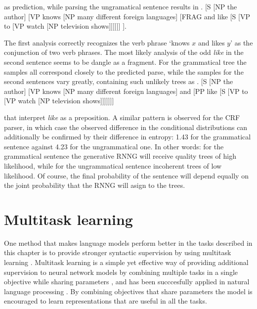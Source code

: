     as prediction, while parsing the ungramatical sentence results in
    \exi. [S [NP the author] [VP knows [NP many different foreign languages] [FRAG and like [S [VP to [VP watch [NP television shows]]]]]] ].

    The first analysis correctly recognizes the verb phrase `knows $x$ and likes $y$' as the conjunction of two verb phrases. The most likely analysis of the odd \textit{like} in the second sentence seems to be dangle as a fragment. For the grammatical tree the samples all correspond closely to the predicted parse, while  the samples for the second sentences vary greatly, containing such unlikely trees as
    \exi. [S [NP the author] [VP knows [NP many different foreign languages] and [PP like [S [VP to [VP watch [NP television shows]]]]]]]

    that interpret \textit{like} as a preposition. A similar pattern is observed for the CRF parser, in which case the observed difference in the conditional distributions can additionally be confirmed by their difference in entropy: 1.43 for the grammatical sentence against 4.23 for the ungrammatical one. In other words: for the grammatical sentence the generative RNNG will receive quality trees of high likelihood, while for the ungrammatical sentence incoherent trees of low likelihood. Of course, the final probability of the sentence will depend equally on the joint probability that the RNNG will asign to the trees.

\section{Multitask learning}
  One method that makes language models perform better in the tasks described in this chapter is to provide stronger syntactic supervision by using multitask learning \citep{enguehard2017multitask,linzen2018targeted}. Multitask learning is a simple yet effective way of providing additional supervision to neural network models by combining multiple tasks in a single objective while sharing parameters \citep{caruana1997multitask}, and has been succcesfully applied in natural language processing \citep{collobert2008unified,collobert2011natural,zhang2016multitask,goldberg2016multitask}. By combining objectives that share parameters the model is encouraged to learn representations that are useful in all the tasks.

